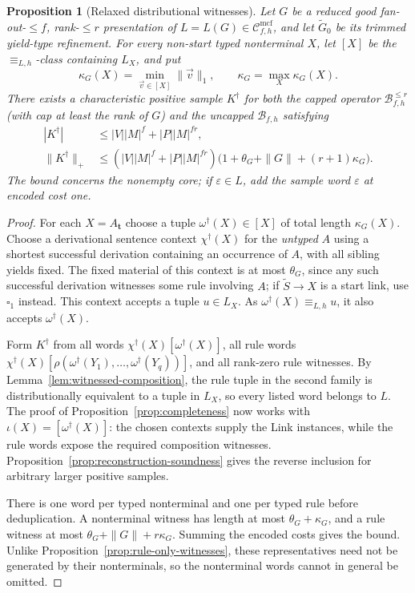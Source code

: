 \documentclass[11pt]{article}
\numberwithin{equation}{section}
\theoremstyle{plain}
\newtheorem{proposition}[theorem]{Proposition}
\theoremstyle{definition}
\theoremstyle{remark}
\newcommand{\Cmcf}[2]{\mathcal{C}^{\mathrm{mcf}}_{#1,#2}}
\newcommand{\tuple}[1]{\vec{#1}}
\newcommand{\blank}{\square}
\newcommand{\eps}{\varepsilon}
\theoremstyle{plain}
\begin{document}
\begin{proposition}[Relaxed distributional witnesses]
\label{prop:mcfg-relaxed-witnesses-v82}
Let $G$ be a reduced good fan-out-$\le f$,
rank-$\le r$ presentation of
$L=L(G)\in\Cmcf{f}{h}$, and let
$\widetilde G_0$ be its trimmed yield-type refinement.
For every non-start typed nonterminal $X$, let $[X]$
be the $\equiv_{L,h}$-class containing $L_X$, and put
\[
 \kappa_G(X)=\min_{\tuple v\in[X]}\|\tuple v\|_1,
 \qquad \kappa_G=\max_X\kappa_G(X).
\]
There exists a characteristic positive sample $K^\dagger$
for both the capped operator $\mathcal B^{\le r}_{f,h}$
(with cap at least the rank of $G$) and the uncapped
$\mathcal B_{f,h}$ satisfying
\[
 \begin{split}
 |K^\dagger|&\le |V||M|^f+|P||M|^{fr},\\
 \|K^\dagger\|_+
 &\le (|V||M|^f+|P||M|^{fr})
 \bigl(1+\theta_G+\|G\|+(r+1)\kappa_G\bigr).
 \end{split}
\]
The bound concerns the nonempty core; if $\eps\in L$,
add the sample word $\eps$ at encoded cost one.
\end{proposition}
\begin{proof}
For each $X=A_{\mathbf t}$ choose a tuple
$\omega^\dagger(X)\in[X]$ of total length
$\kappa_G(X)$.  Choose a derivational sentence context
$\chi^\dagger(X)$ for the \emph{untyped} $A$ using a
shortest successful derivation containing an occurrence
of $A$, with all sibling yields fixed.  The fixed
material of this context is at most $\theta_G$,
since any such successful derivation witnesses some
rule involving $A$; if $\widetilde S\to X$ is a
start link, use $\blank_1$ instead.
This context accepts a tuple $u\in L_X$.
As $\omega^\dagger(X)\equiv_{L,h}u$, it also
accepts $\omega^\dagger(X)$.

Form $K^\dagger$ from all words
$\chi^\dagger(X)[\omega^\dagger(X)]$,
all rule words
$\chi^\dagger(X)[\rho(\omega^\dagger(Y_1),\ldots,
\omega^\dagger(Y_q))]$, and all rank-zero
rule witnesses.  By
Lemma~\ref{lem:witnessed-composition}, the rule
tuple in the second family is distributionally
equivalent to a tuple in $L_X$, so every listed
word belongs to $L$.
The proof of
Proposition~\ref{prop:completeness} now works with
$\iota(X)=[\omega^\dagger(X)]$: the chosen contexts
supply the Link instances, while the rule words
expose the required composition witnesses.
Proposition~\ref{prop:reconstruction-soundness}
gives the reverse inclusion for arbitrary larger
positive samples.

There is one word per typed nonterminal and one per
typed rule before deduplication.  A nonterminal
witness has length at most $\theta_G+\kappa_G$,
and a rule witness at most
$\theta_G+\|G\|+r\kappa_G$.
Summing the encoded costs gives the bound.
Unlike Proposition~\ref{prop:rule-only-witnesses},
these representatives need not be generated by
their nonterminals, so the nonterminal words
cannot in general be omitted.
\end{proof}
\end{document}
